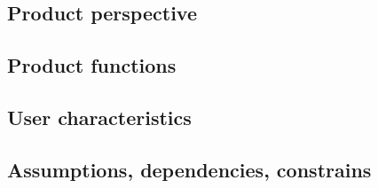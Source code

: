\documentclass[../main.tex]{subfiles}
\begin{document}
\subsection{Product perspective}
\subsection{Product functions}
\subsection{User characteristics}
\subsection{Assumptions, dependencies, constrains}
\end{document}
